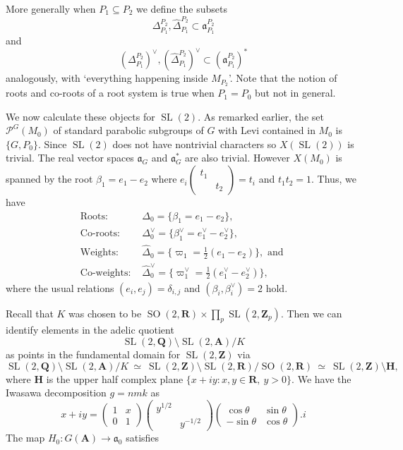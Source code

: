 \documentclass[11pt]{amsart}
\def\A{\mathbf A}
\def\Q{\mathbf Q}
\def\R{\mathbf R}
\def\Z{\mathbf Z}
\def\PPP{\mathcal P}
\def\aaa{\mathfrak a}
\def\bs{\setminus}
\def\se{\subseteq}
\def\sl{\operatorname{SL}}
\def\so{\operatorname{SO}}
\theoremstyle{remark}
\begin{document}
More generally when $P_1 \se P_2$ we define the subsets
\[ \Delta_{P_1}^{P_2}, \hat\Delta_{P_1}^{P_2} \subset \aaa_{P_1}^{P_2} \]
and
\[ (\Delta_{P_1}^{P_2})^\vee, (\hat\Delta_{P_1}^{P_2})^\vee \subset (\aaa_{P_1}^{P_2})^* \]
analogously, with `everything happening inside $M_{P_2}$'. Note that the notion of roots and co-roots of a root system is true when $P_1 = P_0$ but not in general. 


We now calculate these objects for $\sl (2)$. As remarked earlier, the set $\PPP^G(M_0)$ of standard parabolic subgroups of $G$ with Levi contained in $M_0$ is $\{G, P_0\}$. Since $\sl(2)$ does not have nontrivial characters so $X(\sl(2))$ is trivial. The real vector spaces $\aaa_G$ and $\aaa_G^*$ are also trivial. However $X(M_0)$ is spanned by the root $\beta_1 = e_1 - e_2$ where $e_i\begin{pmatrix} t_1 & \\ & t_2 \end{pmatrix} = t_i$ and $t_1 t_2 = 1$. 
Thus, we have
\begin{align*}
	 \text{Roots: } & \Delta_0 = \{\beta_1 = e_1 - e_2 \}, \\
	 \text{Co-roots: } & \Delta_0^\vee = \{ \beta_1^\vee = e_1^\vee - e_2^\vee \}, \\
	 \text{Weights: } & \hat\Delta_0 = \{ \varpi_1 = \frac{1}{2}(e_1 - e_2) \}, \text{ and } \\
	 \text{Co-weights: } & \hat\Delta_0^\vee = \{ \varpi_1^\vee = \frac{1}{2}(e_1^\vee - e_2^\vee) \},
\end{align*}
where the usual relations $(e_i, e_j) = \delta_{i, j}$ and $(\beta_i, \beta_i^\vee) = 2$ hold. 

Recall that $K$ was chosen to be $\so(2, \R) \times \displaystyle\prod_p \sl(2, \Z_p)$. Then we can identify elements in the adelic quotient 
\[ \sl(2, \Q) \bs \sl(2, \A) / K \]
as points in the fundamental domain for $\sl(2, \Z)$ via
\begin{equation} \label{fund_dom} 
\sl(2, \Q) \bs \sl(2, \A) / K \ \simeq \ \sl(2, \Z) \bs \sl(2, \R) / \so(2, \R) \ 
		\simeq \ \sl(2, \Z) \bs \mathbf H,
\end{equation}
where $\mathbf H$ is the upper half complex plane $\{ x + i y : x, y \in \R, \ y > 0\}$. We have the Iwasawa decomposition $g = nmk$ as 
\[ x + i y = \begin{pmatrix} 1 & x \\ 0 & 1 \end{pmatrix} \begin{pmatrix} y^{1/2} & \\ & y^{-1/2} \end{pmatrix}
		\begin{pmatrix} \cos \theta & \sin \theta \\ -\sin \theta & \cos \theta \end{pmatrix} . i \]
The map $H_0 : G(\A) \to \aaa_0$ satisfies
\end{document}
